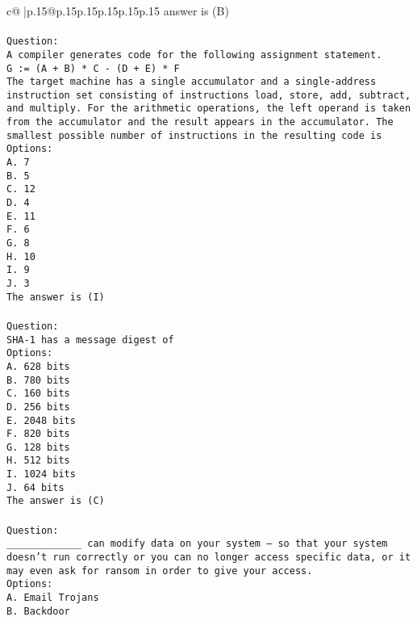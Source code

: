 \documentclass{article}
\begin{document}
{\begin{supertabular}{c@{$\;$}|p{.15\linewidth}@{}p{.15\linewidth}p{.15\linewidth}p{.15\linewidth}p{.15\linewidth}p{.15\linewidth}}
{{{answer is (B)\\ \tt \\ \tt Question:\\ \tt A compiler generates code for the following assignment statement.\\ \tt G := (A + B) * C - (D + E) * F\\ \tt The target machine has a single accumulator and a single-address instruction set consisting of instructions load, store, add, subtract, and multiply. For the arithmetic operations, the left operand is taken from the accumulator and the result appears in the accumulator. The smallest possible number of instructions in the resulting code is\\ \tt Options:\\ \tt A. 7\\ \tt B. 5\\ \tt C. 12\\ \tt D. 4\\ \tt E. 11\\ \tt F. 6\\ \tt G. 8\\ \tt H. 10\\ \tt I. 9\\ \tt J. 3\\ \tt The answer is (I)\\ \tt \\ \tt Question:\\ \tt SHA-1 has a message digest of\\ \tt Options:\\ \tt A. 628 bits\\ \tt B. 780 bits\\ \tt C. 160 bits\\ \tt D. 256 bits\\ \tt E. 2048 bits\\ \tt F. 820 bits\\ \tt G. 128 bits\\ \tt H. 512 bits\\ \tt I. 1024 bits\\ \tt J. 64 bits\\ \tt The answer is (C)\\ \tt \\ \tt Question:\\ \tt _____________ can modify data on your system – so that your system doesn’t run correctly or you can no longer access specific data, or it may even ask for ransom in order to give your access.\\ \tt Options:\\ \tt A. Email Trojans\\ \tt B. Backdoor }}}
\end{supertabular}}
\end{document}
